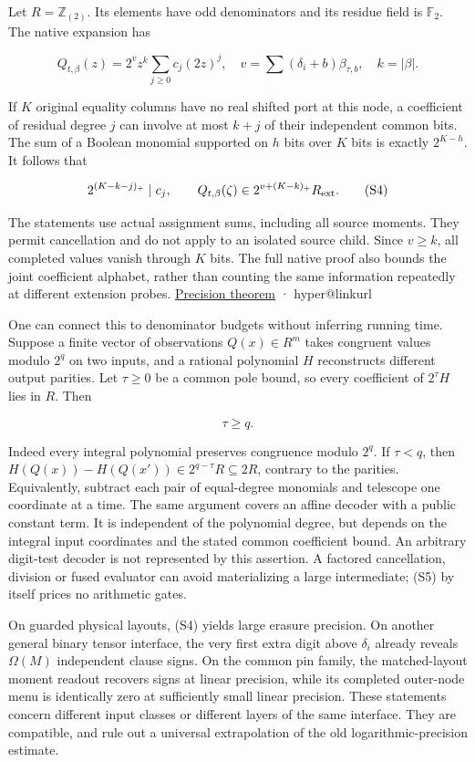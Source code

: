 \documentclass[
  11pt,
]{article}
\makeatletter
\newcommand{\PaperSixCatalogue}[1]{\csname hyper@linkurl\endcsname{#1}{EVIDENCE_CATALOG.md}}
\newcommand{\PaperSixEvidence}[2]{\PaperSixCatalogue{#2}}
\makeatother
\begin{document}
Let \(R=\mathbb Z_{(2)}\). Its elements have odd denominators and its
residue field is \(\mathbb F_2\). The native expansion has

\[
 Q_{t,\beta}(z)=2^v z^k\sum_{j\ge0}c_j(2z)^j,
 \quad v=\sum(\delta_i+b)\beta_{\tau,b},\quad k=|\beta|.
\]

If \(K\) original equality columns have no real shifted port at this
node, a coefficient of residual degree \(j\) can involve at most \(k+j\)
of their independent common bits. The sum of a Boolean monomial
supported on \(h\) bits over \(K\) bits is exactly \(2^{K-h}\). It
follows that

\[
 2^{(K-k-j)_+}\mid c_j,
 \qquad Q_{t,\beta}(\zeta)\in 2^{v+(K-k)_+}R_{\rm ext}.        \tag{S4}
\]

The statements use actual assignment sums, including all source moments.
They permit cancellation and do not apply to an isolated source child.
Since \(v\ge k\), all completed values vanish through \(K\) bits. The
full native proof also bounds the joint coefficient alphabet, rather
than counting the same information repeatedly at different extension
probes. \hyperref[v9-section-precision-frontier]{Precision theorem} ·
\PaperSixEvidence{evidence/research_v9/formal/BooleanSummation.lean}{Boolean-sum Lean proof}

One can connect this to denominator budgets without inferring running
time. Suppose a finite vector of observations \(Q(x)\in R^m\) takes
congruent values modulo \(2^q\) on two inputs, and a rational polynomial
\(H\) reconstructs different output parities. Let \(\tau\ge0\) be a
common pole bound, so every coefficient of \(2^\tau H\) lies in \(R\).
Then

\[
                            \tau\ge q.                        \tag{S5}
\]

Indeed every integral polynomial preserves congruence modulo \(2^q\). If
\(\tau<q\), then \(H(Q(x))-H(Q(x'))\in2^{q-\tau}R\subseteq2R\), contrary
to the parities. Equivalently, subtract each pair of equal-degree
monomials and telescope one coordinate at a time. The same argument
covers an affine decoder with a public constant term. It is independent
of the polynomial degree, but depends on the integral input coordinates
and the stated common coefficient bound. An arbitrary digit-test decoder
is not represented by this assertion. A factored cancellation, division
or fused evaluator can avoid materializing a large intermediate; (S5) by
itself prices no arithmetic gates.

On guarded physical layouts, (S4) yields large erasure precision. On
another general binary tensor interface, the very first extra digit
above \(\delta_i\) already reveals \(\Omega(M)\) independent clause
signs. On the common pin family, the matched-layout moment readout
recovers signs at linear precision, while its completed outer-node menu
is identically zero at sufficiently small linear precision. These
statements concern different input classes or different layers of the
same interface. They are compatible, and rule out a universal
extrapolation of the old logarithmic-precision estimate.
\end{document}

